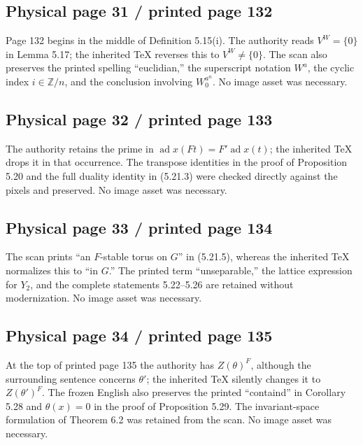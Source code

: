 \documentclass[10pt]{article}
\begin{document}
\subsection*{Physical page 31 / printed page 132}

Page 132 begins in the middle of Definition 5.15(i). The authority reads \(V^W=\{0\}\) in Lemma 5.17; the inherited TeX reverses this to \(V^W\ne\{0\}\). The scan also preserves the printed spelling “euclidian,” the superscript notation \(W^a\), the cyclic index \(i\in\mathbb Z/n\), and the conclusion involving \(W_0^{a^n}\). No image asset was necessary.\par

\subsection*{Physical page 32 / printed page 133}

The authority retains the prime in \(\operatorname{ad}x(Ft)=F'\operatorname{ad}x(t)\); the inherited TeX drops it in that occurrence. The transpose identities in the proof of Proposition 5.20 and the full duality identity in (5.21.3) were checked directly against the pixels and preserved. No image asset was necessary.\par

\subsection*{Physical page 33 / printed page 134}

The scan prints “an \(F\)-stable torus on \(G\)” in (5.21.5), whereas the inherited TeX normalizes this to “in \(G\).” The printed term “unseparable,” the lattice expression for \(Y_2\), and the complete statements 5.22--5.26 are retained without modernization. No image asset was necessary.\par

\subsection*{Physical page 34 / printed page 135}

At the top of printed page 135 the authority has \(Z(\theta)^F\), although the surrounding sentence concerns \(\theta'\); the inherited TeX silently changes it to \(Z(\theta')^F\). The frozen English also preserves the printed “containd” in Corollary 5.28 and \(\theta(x)=0\) in the proof of Proposition 5.29. The invariant-space formulation of Theorem 6.2 was retained from the scan. No image asset was necessary.\par
\end{document}

